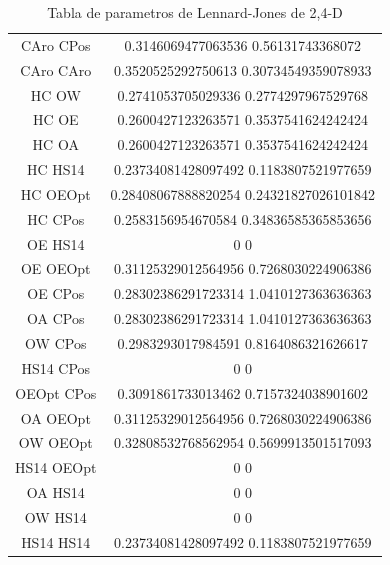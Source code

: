 \begin{table}[!h]
\begin{tabular}{|c|c|}
        CAro     CPos   &     0.3146069477063536 0.56131743368072\\
        CAro     CAro   &     0.3520525292750613 0.30734549359078933\\
        HC	OW	        &     0.2741053705029336 0.2774297967529768\\
        HC	OE	        &     0.2600427123263571 0.3537541624242424\\
        HC	OA	        &     0.2600427123263571 0.3537541624242424\\
        HC     HS14     &     0.23734081428097492 0.1183807521977659\\
        HC    OEOpt     &     0.28408067888820254 0.24321827026101842\\
        HC     CPos     &     0.2583156954670584 0.34836585365853656\\
        OE     HS14     &     0                   0\\
        OE    OEOpt     &     0.31125329012564956 0.7268030224906386\\
        OE     CPos     &     0.28302386291723314 1.0410127363636363\\
        OA     CPos     &     0.28302386291723314 1.0410127363636363\\
        OW     CPos     &     0.2983293017984591 0.8164086321626617\\
        HS14     CPos   &     0                   0\\
        OEOpt     CPos  &     0.3091861733013462 0.7157324038901602\\
        OA    OEOpt     &     0.31125329012564956 0.7268030224906386\\
        OW    OEOpt     &     0.32808532768562954 0.5699913501517093\\
        HS14    OEOpt   &     0                   0\\
        OA     HS14     &     0                   0\\
        OW     HS14     &     0                   0\\
        HS14     HS14   &     0.23734081428097492 0.1183807521977659\\
        \hline
    \end{tabular}
    \caption{Tabla de parametros de Lennard-Jones de 2,4-D}
    \label{tab:my_label}
\end{table}
